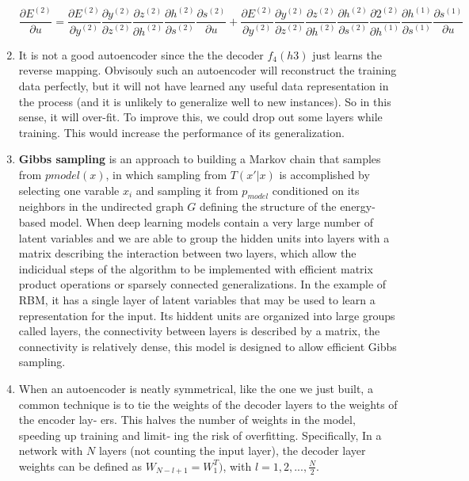 \documentclass[12pt]{article}
\begin{document}
\begin{enumerate}
\[\frac{\partial E^{(2)}}{\partial u} = \frac{\partial E^{(2)}}{\partial{y^{(2)}}} \frac{\partial y^{(2)}}{\partial z^{(2)}} \frac{\partial z^{(2)}}{\partial h^{(2)}} \frac{\partial h^{(2)}}{\partial s^{(2)}} \frac{\partial s^{(2)}}{\partial u} +  \frac{\partial E^{(2)}}{\partial{y^{(2)}}} \frac{\partial y^{(2)}}{\partial z^{(2)}} \frac{\partial z^{(2)}}{\partial h^{(2)}} \frac{\partial h^{(2)}}{\partial s^{(2)}}  \frac{\partial 2^{(2)}}{\partial h^{(1)}} \frac{\partial h^{(1)}}{\partial s^{(1)}} \frac{\partial s^{(1)}}{\partial u}\]

\item It is not a good autoencoder since the the decoder $f_4(h3)$ just learns the reverse mapping. Obvisouly such an autoencoder will reconstruct the training data perfectly, but it will not have learned any useful data representation in the process (and it is unlikely to generalize well to new instances). So in this sense, it will over-fit. To improve this, we could drop out some layers while training. This would increase the performance of its generalization.
\item \textbf{Gibbs sampling} is an approach to building a Markov chain that samples from $pmodel(x)$, in which sampling from $T(x' | x)$ is accomplished by selecting one varable $x_i$ and sampling it from $p_{model}$ conditioned on its neighbors in the undirected graph $G$ defining the structure of the energy-based model.
When deep learning models contain a very large number of latent variables and we are able to group the hidden units into layers with a matrix describing the interaction between two layers, which allow the indicidual steps of the algorithm to be implemented with efficient matrix product operations or sparsely connected generalizations. In the example of RBM, it has a single layer of latent variables that may be used to learn a representation for the input. Its hiddent units are organized into large groups called layers, the connectivity between layers is described by a matrix, the connectivity is relatively dense, this model is designed to allow efficient Gibbs sampling.
\item When an autoencoder is neatly symmetrical, like the one we just built, a common technique is to tie the weights of the decoder layers to the weights of the encoder lay‐ ers. This halves the number of weights in the model, speeding up training and limit‐ ing the risk of overfitting.
Specifically, In a network with $N$ layers (not counting the input layer), the decoder layer weights can be defined as $W_{N-l + 1} = W_1^T)$, with $l = 1, 2, ..., \frac{N}{2}$. 
\end{enumerate}
\end{document}
